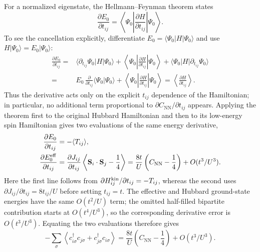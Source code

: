 \documentclass[10pt]{article}
\newcommand{\Cnn}{C_{\mathrm{NN}}}
\begin{document}
For a normalized eigenstate, the Hellmann--Feynman theorem states
\begin{equation}
 \frac{\partial E_0}{\partial t_{ij}}
 =\left\langle\Psi_0\left|
 \frac{\partial H}{\partial t_{ij}}
 \right|\Psi_0\right\rangle .
\label{eq:s-hellmann-feynman}
\end{equation}
To see the cancellation explicitly, differentiate
$E_0=\langle\Psi_0|H|\Psi_0\rangle$ and use
$H|\Psi_0\rangle=E_0|\Psi_0\rangle$:
\begin{equation}
\begin{aligned}
 \frac{\partial E_0}{\partial t_{ij}}
 ={}&\langle\partial_{t_{ij}}\Psi_0|H|\Psi_0\rangle
 +\left\langle\Psi_0\left|\frac{\partial H}{\partial t_{ij}}\right|\Psi_0\right\rangle
 +\langle\Psi_0|H|\partial_{t_{ij}}\Psi_0\rangle\\
 ={}&E_0\,\frac{\partial}{\partial t_{ij}}
 \langle\Psi_0|\Psi_0\rangle
 +\left\langle\Psi_0\left|\frac{\partial H}{\partial t_{ij}}\right|\Psi_0\right\rangle
 =\left\langle\frac{\partial H}{\partial t_{ij}}\right\rangle .
\end{aligned}
\label{eq:s-hellmann-feynman-proof}
\end{equation}
Thus the derivative acts only on the explicit $t_{ij}$ dependence of the
Hamiltonian; in particular, no additional term proportional to
$\partial\Cnn/\partial t_{ij}$ appears. Applying the theorem first to the
original Hubbard Hamiltonian and then to its low-energy spin Hamiltonian gives
two evaluations of the same energy derivative,
\begin{equation}
\begin{aligned}
 \frac{\partial E_0}{\partial t_{ij}}
 &=-\langle T_{ij}\rangle,\\
 \frac{\partial E_0^{\rm eff}}{\partial t_{ij}}
 &=\frac{\partial J_{ij}}{\partial t_{ij}}
 \left\langle\mathbf S_i\cdot\mathbf S_j-\frac14\right\rangle
 =\frac{8t}{U}\left(\Cnn-\frac14\right)
 +O(t^3/U^3).
\end{aligned}
\label{eq:s-energy-derivatives}
\end{equation}
Here the first line follows from
$\partial H^{\rm kin}_{ij}/\partial t_{ij}=-T_{ij}$, whereas the second uses
$\partial J_{ij}/\partial t_{ij}=8t_{ij}/U$ before setting $t_{ij}=t$.
The effective and Hubbard ground-state energies have the same $O(t^2/U)$
term; the omitted half-filled bipartite contribution starts at
$O(t^4/U^3)$, so the corresponding derivative error is $O(t^3/U^3)$.
Equating the two evaluations therefore gives
\begin{equation}
 -\sum_\sigma\left\langle
 c^\dagger_{i\sigma}c_{j\sigma}+c^\dagger_{j\sigma}c_{i\sigma}
 \right\rangle
 =\frac{8t}{U}\left(\Cnn-\frac14\right)+O(t^3/U^3).
\label{eq:s-bond-hf-identity}
\end{equation}
\end{document}
